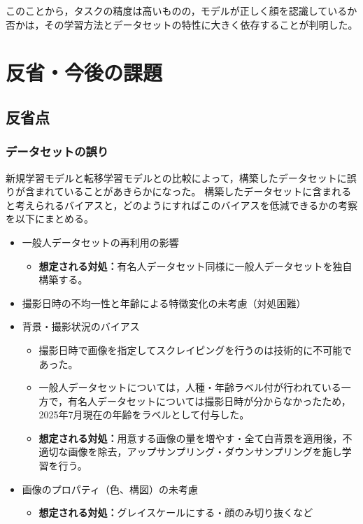 \documentclass[a4paper,11pt,titlepage]{jsarticle}
\begin{document}
このことから，タスクの精度は高いものの，モデルが正しく顔を認識しているか否かは，その学習方法とデータセットの特性に大きく依存することが判明した。



\section{反省・今後の課題}

\subsection{反省点}
\subsubsection*{データセットの誤り}
新規学習モデルと転移学習モデルとの比較によって，構築したデータセットに誤りが含まれていることがあきらかになった。
構築したデータセットに含まれると考えられるバイアスと，どのようにすればこのバイアスを低減できるかの考察を以下にまとめる。
\begin{itemize}
	\item 一般人データセットの再利用の影響
		\begin{itemize}
			\item \textbf{想定される対処：}有名人データセット同様に一般人データセットを独自構築する。
		\end{itemize}
	\item  撮影日時の不均一性と年齢による特徴変化の未考慮（対処困難）
	\item 背景・撮影状況のバイアス
		\begin{itemize}
			\item 撮影日時で画像を指定してスクレイピングを行うのは技術的に不可能であった。
			\item 一般人データセットについては，人種・年齢ラベル付が行われている一方で，有名人データセットについては撮影日時が分からなかったため，2025年7月現在の年齢をラベルとして付与した。
			\item \textbf{想定される対処：}用意する画像の量を増やす・全て白背景を適用後，不適切な画像を除去，アップサンプリング・ダウンサンプリングを施し学習を行う。
		\end{itemize}
	\item 画像のプロパティ（色、構図）の未考慮
		\begin{itemize}
			\item \textbf{想定される対処：}グレイスケールにする・顔のみ切り抜くなど
		\end{itemize}
\end{itemize}
\end{document}
